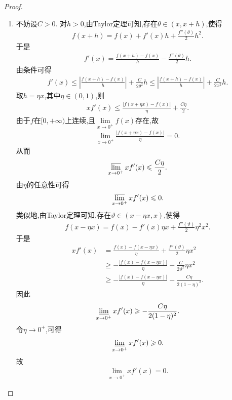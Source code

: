 \documentclass[../../main.tex]{subfiles}%
\begin{document}
\begin{proof}
\begin{enumerate}[(1)]
\item 不妨设$C>0$. 对$h>0$,由Taylor定理可知,存在$\theta\in(x,x+h)$,使得
\begin{align*}
f(x+h)=f(x)+f'(x)h+\frac{f''(\theta)}{2}h^2.
\end{align*}
于是
\begin{align*}
f'(x)=\frac{f(x+h)-f(x)}{h}-\frac{f''(\theta)}{2}h.
\end{align*}
由条件可得
\begin{align*}
f'(x)
\leqslant\left|\frac{f(x+h)-f(x)}{h}\right|+\frac{C}{2\theta^2}h
\leqslant\left|\frac{f(x+h)-f(x)}{h}\right|+\frac{C}{2x^2}h.
\end{align*}
取$h=\eta x$,其中$\eta\in(0,1)$,则
\begin{align*}
xf'(x)
\leqslant\frac{|f(x+\eta x)-f(x)|}{\eta}
+\frac{C\eta}{2}.
\end{align*}
由于$f$在$[0,+\infty)$上连续,且$\lim\limits_{x\to0^+}f(x)$存在,故
\begin{align*}
\lim\limits_{x\to0^+}\frac{|f(x+\eta x)-f(x)|}{\eta}=0.
\end{align*}
从而
\begin{align*}
\varlimsup\limits_{x\to0^+}xf'(x)\leqslant\frac{C\eta}{2}.
\end{align*}
由$\eta$的任意性可得
\begin{align*}
\varlimsup\limits_{x\to0^+}xf'(x)\leqslant0.
\end{align*}
类似地,由Taylor定理可知,存在$\vartheta\in(x-\eta x,x)$,使得
\begin{align*}
f(x-\eta x)=f(x)-f'(x)\eta x+\frac{f''(\vartheta)}{2}\eta^2x^2.
\end{align*}
于是
\begin{align*}
xf'(x)
&=\frac{f(x)-f(x-\eta x)}{\eta}
+\frac{f''(\vartheta)}{2}\eta x^2\\
&\geqslant-\frac{|f(x)-f(x-\eta x)|}{\eta}
-\frac{C}{2\vartheta^2}\eta x^2\\
&\geqslant-\frac{|f(x)-f(x-\eta x)|}{\eta}
-\frac{C\eta}{2(1-\eta)^2}.
\end{align*}
因此
\begin{align*}
\varliminf\limits_{x\to0^+}xf'(x)
\geqslant-\frac{C\eta}{2(1-\eta)^2}.
\end{align*}
令$\eta\to0^+$,可得
\begin{align*}
\varliminf\limits_{x\to0^+}xf'(x)\geqslant0.
\end{align*}
故
\begin{align*}
\lim\limits_{x\to0^+}xf'(x)=0.
\end{align*}


\end{enumerate}
\end{proof}
\end{document}
